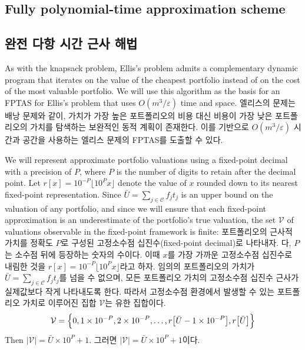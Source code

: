 \documentclass[11pt]{article} %
\theoremstyle{definition}
\theoremstyle{definition}
\begin{document}
\ifen \subsection{Fully polynomial-time approximation scheme}\else \subsection{완전 다항 시간 근사 해법}\fi \label{fptashead}
\ifen 
As with the knapsack problem, Ellis's problem admits a complementary dynamic program that iterates on the value of the cheapest portfolio instead of on the cost of the most valuable portfolio. We will use this algorithm as the basis for an FPTAS for Ellis's problem that uses $O(m^3 / \varepsilon)$ time and space.%
\else
엘리스의 문제는 배낭 문제와 같이, 가치가 가장 높은 포트폴리오의 비용 대신 비용이 가장 낮은 포트폴리오의 가치를 탐색하는 보완적인 동적 계획이 존재한다. 이를 기반으로  $O(m^3 / \varepsilon)$ 시간과 공간을 사용하는 엘리스 문제의 FPTAS를 도출할 수 있다.%
\fi


\ifen 
We will represent approximate portfolio valuations using a fixed-point decimal with a precision of $P$, where $P$ is the number of digits to retain after the decimal point. Let $r[x] =  10^{-P}\lfloor 10^P x \rfloor$ denote the value of $x$ rounded down to its nearest fixed-point representation. Since $\bar U = \sum_{j\in \mathcal{C}} f_j t_j$ is an upper bound on the valuation of any portfolio, and since we will ensure that each fixed-point approximation is an underestimate of the portfolio's true valuation, the set $\mathcal{V}$ of  valuations observable in the fixed-point framework is finite:
\else
포트폴리오의 근사적 가치를 정확도 $P$로 구성된 고정소수점 십진수(fixed-point decimal)로 나타내자. 다, $P$는 소수점 뒤에 등장하는 숫자의 수이다. 이때 $x$를 가장 가까운 고정소수점 십진수로 내림한 것을 $r[x] =  10^{-P}\lfloor 10^P x \rfloor$라고 하자. 임의의 포트폴리오의 가치가 $\bar U = \sum_{j\in \mathcal{C}} f_j t_j$를 넘을 수 없으며, 모든 포트폴리오 가치의 고정소수점 십진수 근사가 실제값보다 작게 나타내도록 한다. 따라서 고정소수점 환경에서 발생할 수 있는 포트폴리오 가치로 이루어진 집합 $\mathcal{V}$는 유한 집합이다.
\fi
\begin{equation}
\mathcal{V} = \Bigl\{0, 1\times 10^{-P}, 2\times 10^{-P}, \dots, r\bigl[\bar U- 1\times 10^{-P}\bigr], r\bigl[\bar U\bigr]\Bigr\}
\end{equation}
\ifen Then $|\mathcal{V} | = \bar U \times 10^P + 1$.
\else 그러면 $|\mathcal{V} | = \bar U \times 10^P + 1$이다.\fi
\end{document}
